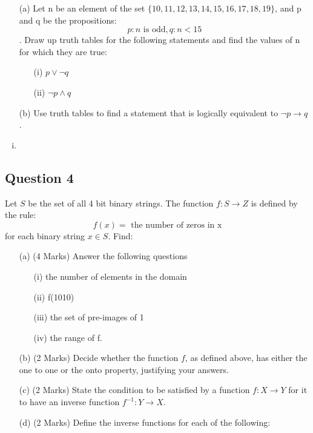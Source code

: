 \documentclass[12pt]{article} %
\begin{document}
\begin{itemize}
\item[(a)] Let n be an element of the set $\{10, 11, 12, 13, 14, 15, 16, 17, 18, 19\}$,
and p and q be the propositions:
\[p : n \mbox{ is odd},   q : n < 15\]. Draw up truth tables for the following statements and find the values of n for
which they are true:
\begin{itemize}
\item[(i)] $ p \vee \neg q$ 
\item[(ii)] $\neg p \wedge q$
\end{itemize}
\item[(b)] Use truth tables to find a statement that is logically equivalent to $\neg p \rightarrow q$.
\end{itemize}

\begin{enumerate}[(i)]
\item
\end{enumerate}
\subsection*{Question 4}
Let $S$ be the set of all 4 bit binary strings. The function $f : S \rightarrow Z$
is defined by the rule:
\[f(x) = \mbox{ the number of zeros in x} \] for each binary string $x \in S$.
Find:
\begin{itemize}
	\item[(a)] (4 Marks) Answer the following questions
\begin{itemize}
\item[(i)] the number of elements in the domain
\item[(ii)] f(1010)
\item[(iii)] the set of pre-images of 1
\item[(iv)] the range of f. 
\end{itemize}
\item[(b)] (2 Marks) Decide whether the function $f$, as defined above, has either the one to one or
the onto property, justifying your answers. 
\item[(c)] (2 Marks) State the condition to be satisfied by a function $f : X \rightarrow Y$ for it to have an
inverse function $f^{−1} : Y \rightarrow X$.
\item[(d)] (2 Marks) Define the inverse functions for each of the following:
\end{itemize}
\end{document}
